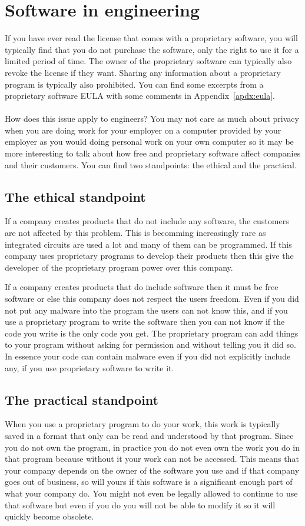 \documentclass[12pt,a4paper]{article}
\begin{document}
\section{Software in engineering}
If you have ever read the license that comes with a proprietary software, you will typically find that you do not purchase the software, only the right to use it for a limited period of time. The owner of the proprietary software can typically also revoke the license if they want. Sharing any information about a proprietary program is typically also prohibited. You can find some excerpts from a proprietary software EULA with some comments in Appendix~\ref{apdx:eula}.
\\\\
How does this issue apply to engineers? You may not care as much about privacy when you are doing work for your employer on a computer provided by your employer as you would doing personal work on your own computer so it may be more interesting to talk about how free and proprietary software affect companies and their customers. You can find two standpoints: the ethical and the practical.

\subsection{The ethical standpoint}
If a company creates products that do not include any software, the customers are not affected by this problem. This is becomming increasingly rare as integrated circuits are used a lot and many of them can be programmed. If this company uses proprietary programs to develop their products then this give the developer of the proprietary program power over this company.

If a company creates products that do include software then it must be free software or else this company does not respect the users freedom. Even if you did not put any malware into the program the users can not know this, and if you use a proprietary program to write the software then you can not know if the code you write is the only code you get. The proprietary program can add things to your program without asking for permission and without telling you it did so. In essence your code can contain malware even if you did not explicitly include any, if you use proprietary software to write it.

\subsection{The practical standpoint}
When you use a proprietary program to do your work, this work is typically saved in a format that only can be read and understood by that program. Since you do not own the program, in practice you do not even own the work you do in that program because without it your work can not be accessed. This means that your company depends on the owner of the software you use and if that company goes out of business, so will yours if this software is a significant enough part of what your company do. You might not even be legally allowed to continue to use that software but even if you do you will not be able to modify it so it will quickly become obsolete.
\end{document}
